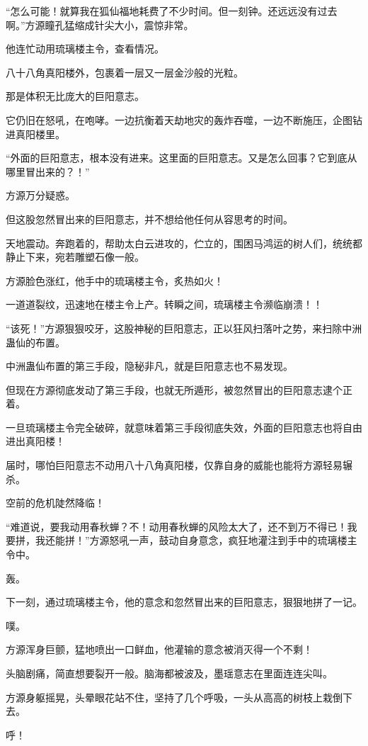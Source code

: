 \begin{this_body}
“怎么可能！就算我在狐仙福地耗费了不少时间。但一刻钟。还远远没有过去啊。”方源瞳孔猛缩成针尖大小，震惊非常。

他连忙动用琉璃楼主令，查看情况。

八十八角真阳楼外，包裹着一层又一层金沙般的光粒。

那是体积无比庞大的巨阳意志。

它仍旧在怒吼，在咆哮。一边抗衡着天劫地灾的轰炸吞噬，一边不断施压，企图钻进真阳楼里。

“外面的巨阳意志，根本没有进来。这里面的巨阳意志。又是怎么回事？它到底从哪里冒出来的？！”

方源万分疑惑。

但这股忽然冒出来的巨阳意志，并不想给他任何从容思考的时间。

天地震动。奔跑着的，帮助太白云进攻的，伫立的，围困马鸿运的树人们，统统都静止下来，宛若雕塑石像一般。

方源脸色涨红，他手中的琉璃楼主令，炙热如火！

一道道裂纹，迅速地在楼主令上产。转瞬之间，琉璃楼主令濒临崩溃！！

“该死！”方源狠狠咬牙，这股神秘的巨阳意志，正以狂风扫落叶之势，来扫除中洲蛊仙的布置。

中洲蛊仙布置的第三手段，隐秘非凡，就是巨阳意志也不易发现。

但现在方源彻底发动了第三手段，也就无所遁形，被忽然冒出的巨阳意志逮个正着。

一旦琉璃楼主令完全破碎，就意味着第三手段彻底失效，外面的巨阳意志也将自由进出真阳楼！

届时，哪怕巨阳意志不动用八十八角真阳楼，仅靠自身的威能也能将方源轻易辗杀。

空前的危机陡然降临！

“难道说，要我动用春秋蝉？不！动用春秋蝉的风险太大了，还不到万不得已！我要拼，我还能拼！”方源怒吼一声，鼓动自身意念，疯狂地灌注到手中的琉璃楼主令中。

轰。

下一刻，通过琉璃楼主令，他的意念和忽然冒出来的巨阳意志，狠狠地拼了一记。

噗。

方源浑身巨颤，猛地喷出一口鲜血，他灌输的意念被消灭得一个不剩！

头脑剧痛，简直想要裂开一般。脑海都被波及，墨瑶意志在里面连连尖叫。

方源身躯摇晃，头晕眼花站不住，坚持了几个呼吸，一头从高高的树枝上栽倒下去。

呼！


\end{this_body}
